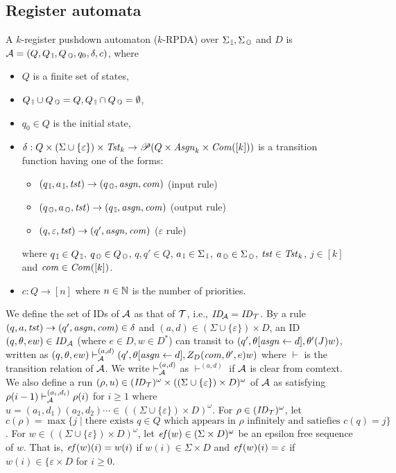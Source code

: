 \subsection{Register automata}\label{sec:RA}
\begin{definition}
A $k$-register pushdown automaton ($k$-RPDA) over $\Sigma_{\, \mathbb{I}},\Sigma_{\, \mathbb{O}}$ and $D$ is ${\cal A}=(Q, Q_{\, \mathbb{I}}, Q_{\, \mathbb{O}}, q_0, \delta, c)$, where
\begin{itemize}
\item $Q$ is a finite set of states,
\item $Q_{\, \mathbb{I}}\cup Q_{\, \mathbb{O}} = Q, Q_{\, \mathbb{I}}\cap Q_{\, \mathbb{O}} = \emptyset$,
\item $q_0\in Q$ is the initial state,
\item $\delta: Q \times (\Sigma\cup\{\varepsilon\})\times \mathit{Tst}_k \to \mathscr{P}(Q \times\mathit{Asgn}_k\times \mathit{Com}([k]))$ is a transition function having one of the forms:
\begin{itemize}
\item $(q_{\, \mathbb{I}},a_{\, \mathbb{I}},\mathit{tst})\to(q_{\, \mathbb{O}},\mathit{asgn},\mathit{com})$ (input rule)
\item $(q_{\, \mathbb{O}},a_{\, \mathbb{O}},\mathit{tst})\to(q_{\, \mathbb{I}},\mathit{asgn},\mathit{com})$ (output rule)
\item $(q,\varepsilon,\mathit{tst})\to(q',\mathit{asgn},\mathit{com})$ ($\varepsilon$ rule)
\end{itemize}
where $q_{\, \mathbb{I}}\in Q_{\, \mathbb{I}}$, $q_{\, \mathbb{O}}\in Q_{\, \mathbb{O}}$, $q,q'\in Q$, $a_{\, \mathbb{I}}\in\Sigma_{\, \mathbb{I}}$, $a_{\, \mathbb{O}}\in\Sigma_{\, \mathbb{O}}$, $\mathit{tst}\in\mathit{Tst}_k$, $j\in[k]$ and $\mathit{com}\in\mathit{Com}([k])$.
\item $c: Q \to [n]$ where $n\in \mathbb{N}$ is the number of priorities.
\end{itemize}
\end{definition}
\noindent
We define the set of IDs of ${\cal A}$ as
that of ${\cal T}$, i.e.,
$\mathit{ID}_{\!{\cal A}}=\mathit{ID}_{{\cal T}}$.
By a rule $(q,a,\mathit{tst})\to(q',\mathit{asgn},\mathit{com})\in\delta$ and $(a,d)\in (\Sigma\cup\{\varepsilon\})\times D$,
an ID $(q,\theta,ew)\in\mathit{ID}_{\cal A}$ (where $e\in D, w\in D^*$)
can transit to $(q',\theta[\mathit{asgn}\leftarrow d], \theta'(J)w)$,
written as $(q,\theta,ew)\vdash^{(a,d)}_{\cal A}(q',\theta[\mathit{asgn}\leftarrow d], Z_D(\mathit{com},\theta',e)w)$ where $\vdash$ is the transition relation of ${\cal A}$.
We write $\vdash^{(a,d)}_{\cal A}$ as $\vdash^{(a,d)}$ if ${\cal A}$ is clear from comtext.
We also define a run $(\rho, u)\in (\mathit{ID}_{\cal T})^\omega\times ((\Sigma\cup\{\varepsilon\})\times D)^\omega$ of ${\cal A}$ as satisfying $\rho(i-1)\vdash_{\cal A}^{(a_i,d_i)}\rho(i)$ for $i\geq 1$ where $u= (a_1,d_1)(a_2,d_2)\cdots\in ((\Sigma\cup\{\varepsilon\})\times D)^\omega$.
For $\rho \in (\mathit{ID}_{\cal T})^\omega$, let $c(\rho)=\max\{j\mid
\text{there exists $q\in Q$ which appears in $\rho$}\allowbreak \text{ infinitely and satiefies $c(q)=j$}\}$.
For $w\in ((\Sigma\cup\{\varepsilon\})\times D)^\omega$, let
$\mathit{ef}(w)\in (\Sigma\times D)^\omega$ be an epsilon free sequence of $w$.
That is, $\mathit{ef}(w)(i) = w(i)$ if $w(i)\in \Sigma\times D$ and $\mathit{ef}(w)(i)=\varepsilon$ if $w(i)\in \{\varepsilon\times D$ for $i\geq 0$.

